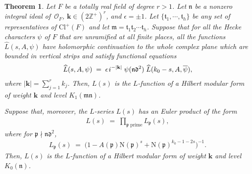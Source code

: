 \documentclass[11pt]{amsart}
\newtheorem{theorem}{Theorem}[section]
\theoremstyle{remark}
\newcommand\mbf[1]{\mathbf{#1}}
\newcommand\fr[1]{\mathfrak{#1}}
\newcommand\ov[1]{\overline{#1}}
\newcommand\wh[1]{\widehat{#1}}
\newcommand{\inte}{\mathbb{Z}}
\newcommand{\clo}{\mathcal{O}}
\newcommand{\eq}{\;=\;}
\def\thin{{\hskip 1pt}}
\newcommand{\N}{\mathrm{N}}
\newcommand{\Cl}{\mathrm{Cl}}
\begin{document}
\begin{theorem}
\label{mainthm}
Let $F$ be a totally real field of degree $r>1$. Let $\fr{n}$ be a nonzero integral ideal of~$\clo_F$, $\mbf{k}\in(2\inte^+)^r$, and $\epsilon=\pm1$. Let $\{\fr{t}_1,\cdots,\fr{t}_h\}$ be any set of representatives of $\Cl^+(F)$ and let $\fr{m}=\fr{t}_1\fr{t}_2\cdots\fr{t}_h$. Suppose that for all the Hecke characters $\psi$ of $F$ that are unramified at all finite places, all the functions $\wh{L}(s,A,\psi)$ have holomorphic continuation to the whole complex plane which are bounded in vertical strips and satisfy functional equations
\begin{align*}
    \wh{L}(s,A,\psi)\eq \epsilon \thin i^{-|\mbf{k}|}\;\psi(\fr{n}\fr{d}^2)\;\wh{L}(k_0-s,A,\ov{\psi}),
\end{align*}
where $|\mbf{k}|=\sum_{j=1}^rk_j$. Then, $L(s)$ is the $L$-function of a Hilbert modular form of weight $\mbf{k}$ and level $K_1(\fr{m}\fr{n})$.

Suppose that, moreover, the $L$-series $L(s)$ has an Euler product of the form
\begin{align*}
    L(s)\eq\prod_{\fr{p}\text{ prime}}L_\fr{p}(s),
\end{align*}
where for $\fr{p}\nmid\fr{n}\fr{d}^2$,
\begin{align*}
    L_\fr{p}(s)\eq\big(1-A(\fr{p})\N(\fr{p})^s+\N(\fr{p})^{k_0-1-2s}\big)^{-1}.
\end{align*}
Then, $L(s)$ is the $L$-function of a Hilbert modular form of weight $\mbf{k}$ and level $K_0(\fr{n})$.
\end{theorem}
\end{document}
